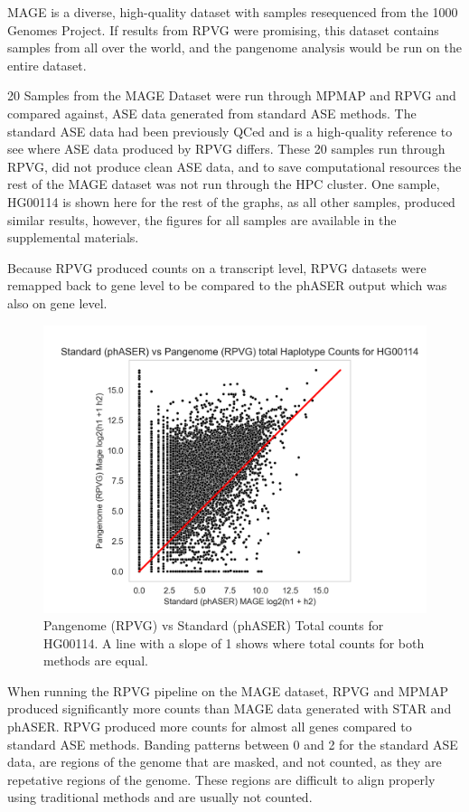 \documentclass{article}
\begin{document}
MAGE is a diverse, high-quality dataset with samples resequenced from the 1000 Genomes 
Project. \citep{Taylor_2024} If results from RPVG were promising, this dataset contains samples from
all over the world, and the pangenome analysis would be run on the entire dataset. 

20 Samples from the MAGE Dataset were run through MPMAP and RPVG and compared against, 
ASE data generated from standard ASE methods. The standard ASE data had been previously QCed and is a high-quality reference
to see where ASE data produced by RPVG differs. These 20 samples run through RPVG, did not produce
clean ASE data, and to save computational resources the rest of the MAGE dataset was not run through 
the HPC cluster. One sample, HG00114 is shown here for the rest of the graphs, as all other samples,
produced similar results, however, the figures for all samples are available in the supplemental materials.

Because RPVG produced counts on a transcript level, RPVG datasets 
were remapped back to gene level to be compared to the phASER output
which was also on gene level.

\begin{figure}[htbp]
  \centering
  \includegraphics[width=0.8\linewidth]{HG00114_PAN_MAGE_log_plot.png}
  \caption{Pangenome (RPVG) vs Standard (phASER) Total counts for HG00114. A line with a slope of 1 shows
  where total counts for both methods are equal.}
\end{figure}  
\vspace{2em}

When running the RPVG pipeline on the MAGE dataset, RPVG and MPMAP produced significantly more counts 
than MAGE data generated with STAR and phASER. RPVG produced more counts for almost all genes 
compared to standard ASE methods. Banding patterns between 0 and 2 for the standard ASE data, are 
regions of the genome that are masked, and not counted, as they are repetative regions of the genome.
These regions are difficult to align properly using traditional methods and are usually not counted.
\end{document}
